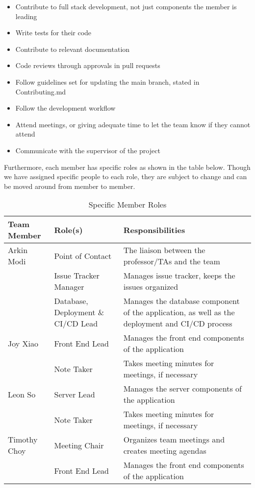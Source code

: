 \documentclass{article}
\begin{document}
\begin{itemize}
	\item Contribute to full stack development, not just components the member is leading
	\item Write tests for their code
	\item Contribute to relevant documentation
	\item Code reviews through approvals in pull requests
	\item Follow guidelines set for updating the main branch, stated in Contributing.md
	\item Follow the development workflow
	\item Attend meetings, or giving adequate time to let the team know if they cannot attend
	\item Communicate with the supervisor of the project
\end{itemize}

Furthermore, each member has specific roles as shown in the table below. Though we have assigned 
specific people to each role, they are subject to change and can be moved around from member to 
member.

\begin{table}[H]
	\centering
	\caption{Specific Member Roles}
	\vspace{5pt}
	\begin{tabular}{|p{}|p{}|p{}|}
		\hline
		\textbf{Team Member} & \textbf{Role(s)} & \textbf{Responsibilities} \\ 
		\hline
		Arkin Modi & Point of Contact & The liaison between the professor/TAs 
		and the team \\
		\cline{2-3}
		& Issue Tracker Manager & Manages issue tracker, keeps the issues 
		organized\\
		\cline{2-3}
		& Database, Deployment \& CI/CD Lead & Manages the database component of the application, as 
		well as the deployment and CI/CD process \\
		\hline
		Joy Xiao & Front End Lead & Manages the front end components of the application \\
		\cline{2-3}
		& Note Taker & Takes meeting minutes for meetings, if necessary \\
		\hline
		Leon So & Server Lead & Manages the server components of the application \\
		\cline{2-3}
		& Note Taker & Takes meeting minutes for meetings, if necessary \\
		\hline
		Timothy Choy & Meeting Chair & Organizes team meetings and creates meeting agendas \\
		\cline{2-3}
		& Front End Lead & Manages the front end components of the application \\
		\hline
	\end{tabular}
\end{table}
\end{document}

